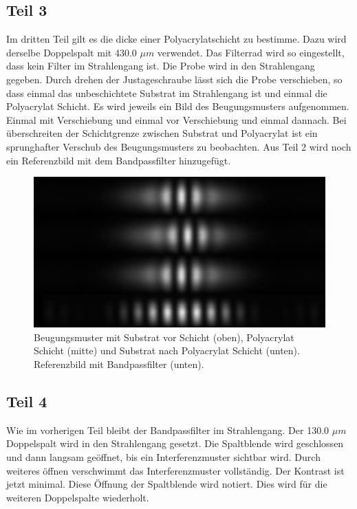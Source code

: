 \documentclass[12pt,a4paper,twoside]{article}
\begin{document}
\subsection{Teil 3}
Im dritten Teil gilt es die dicke einer Polyacrylatschicht zu bestimme. Dazu wird derselbe Doppelspalt mit 430.0 $\mu m$ verwendet. Das Filterrad wird so eingestellt, dass kein Filter im Strahlengang ist. 
Die Probe wird in den Strahlengang gegeben. Durch drehen der Justageschraube lässt sich die Probe verschieben, so dass einmal das unbeschichtete Substrat im Strahlengang ist und einmal die Polyacrylat Schicht. 
Es wird jeweils ein Bild des Beugungsmusters aufgenommen. Einmal mit Verschiebung und einmal vor Verschiebung und einmal dannach. Bei überschreiten der Schichtgrenze zwischen Substrat und Polyacrylat ist ein sprunghafter Verschub des Beugungsmusters zu beobachten. 
Aus Teil 2 wird noch ein Referenzbild mit dem Bandpassfilter hinzugefügt. 

\begin{figure}[H]
    \centering
    \includegraphics[width=0.6\linewidth]{nudes/aufgabe 3 neu.jpg}
    \caption{Beugungsmuster mit Substrat vor Schicht (oben), Polyacrylat Schicht (mitte) und Substrat nach Polyacrylat Schicht (unten). Referenzbild mit Bandpassfilter (unten). }
    \label{fig:aufgabe 3}
\end{figure}

\subsection{Teil 4}
Wie im vorherigen Teil bleibt der Bandpassfilter im Strahlengang. 
Der 130.0 $\mu m$ Doppelspalt wird in den Strahlengang gesetzt. Die Spaltblende wird geschlossen und dann langsam geöffnet, bis ein Interferenzmuster sichtbar wird. 
Durch weiteres öffnen verschwimmt das Interferenzmuster vollständig. Der Kontrast ist jetzt minimal. Diese Öffnung der Spaltblende wird notiert. 
Dies wird für die weiteren Doppelspalte wiederholt.  
\end{document}
